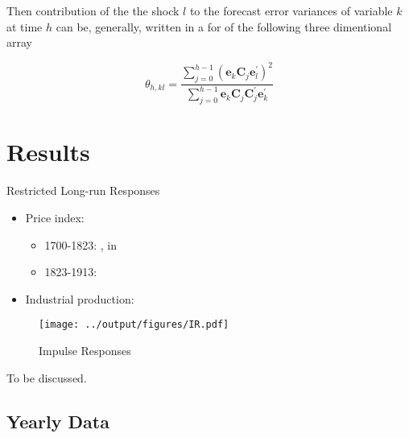 \documentclass[a4paper,12pt]{article}
\begin{document}
Then contribution of the the shock \(l\) to the forecast error variances of variable \(k\) at time \(h\) can be, generally, written in a for of the following three dimentional array

\begin{equation} \label{eq:13}
		\theta_{h, k l}=\frac{\sum_{j=0}^{h-1}\left(\mathbf{e}_{k} \mathbf{C}_{j} \mathbf{e}_{l}^{\prime}\right)^{2}}{\sum_{j=0}^{h-1} \mathbf{e}_{k} \mathbf{C}_{j} \mathbf{C}_{j}^{\prime} \mathbf{e}_{k}^{\prime}}
\end{equation}

\newpage

\section{Results}

\begin{table}
\label{table:3}
\caption{Restricted Long-run Responses}
\centering

\end{table}

\begin{itemize}
\item Price index:
\begin{itemize}
\item 1700-1823: \citet{schumpeter38}, in \citet[p. 468-469]{mitchelldeane71}
\item 1823-1913: \citet[p. 863-864]{mitchelle2003}
\end{itemize}

\item Industrial production: \citet[p. 725-727]{craftsharley92}

\end{itemize}

\begin{figure}[H]
    \centering
\caption{Impulse Responses}
    \texttt{[image: ../output/figures/IR.pdf]} 
\end{figure}

To be discussed.

\pagebreak

\begin{appendices}
\section{Yearly Data}

\begin{table}[h]
\centering

\end{table}

\end{appendices}

\pagebreak


\end{document}
